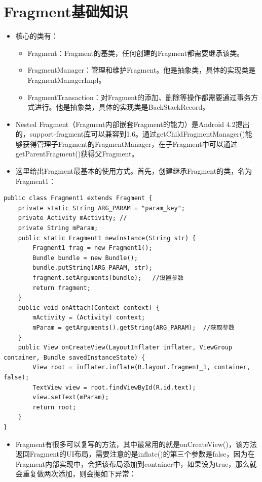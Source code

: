 \documentclass[9pt, b5paaper]{book}
\begin{document}
\section{Fragment基础知识}
\label{sec-2-9}
\begin{itemize}
\item 核心的类有：
\begin{itemize}
\item Fragment：Fragment的基类，任何创建的Fragment都需要继承该类。
\item FragmentManager：管理和维护Fragment。他是抽象类，具体的实现类是FragmentManagerImpl。
\item FragmentTransaction：对Fragment的添加、删除等操作都需要通过事务方式进行。他是抽象类，具体的实现类是BackStackRecord。
\end{itemize}
\item Nested Fragment（Fragment内部嵌套Fragment的能力）是Android 4.2提出的，support-fragment库可以兼容到1.6。通过getChildFragmentManager()能够获得管理子Fragment的FragmentManager，在子Fragment中可以通过getParentFragment()获得父Fragment。
\item 这里给出Fragment最基本的使用方式。首先，创建继承Fragment的类，名为Fragment1：
\end{itemize}
\begin{verbatim}
public class Fragment1 extends Fragment {
    private static String ARG_PARAM = "param_key";
    private Activity mActivity; // 
    private String mParam;
    public static Fragment1 newInstance(String str) {
        Fragment1 frag = new Fragment1();
        Bundle bundle = new Bundle();
        bundle.putString(ARG_PARAM, str);
        fragment.setArguments(bundle);   //设置参数
        return fragment;
    }
    public void onAttach(Context context) {
        mActivity = (Activity) context;
        mParam = getArguments().getString(ARG_PARAM);  //获取参数
    }
    public View onCreateView(LayoutInflater inflater, ViewGroup container, Bundle savedInstanceState) {
        View root = inflater.inflate(R.layout.fragment_1, container, false);
        TextView view = root.findViewById(R.id.text);
        view.setText(mParam);
        return root;
    }
}
\end{verbatim}
\begin{itemize}
\item Fragment有很多可以复写的方法，其中最常用的就是onCreateView()，该方法返回Fragment的UI布局，需要注意的是inflate()的第三个参数是false，因为在Fragment内部实现中，会把该布局添加到container中，如果设为true，那么就会重复做两次添加，则会抛如下异常：
\end{itemize}
\end{document}
